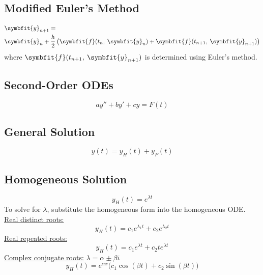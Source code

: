 \documentclass{article}
\begin{document}
\begin{multicols}{3}
    \subsection*{Modified Euler's Method}
    \begin{align*}
         & \symbfit{y}_{n+1} =                                                                                                       \\
         & \symbfit{y}_{n} + \frac{h}{2}\left( \symbfit{f}(t_n,\: \symbfit{y}_n) + \symbfit{f}(t_{n+1},\: \symbfit{y}_{n+1}) \right)
    \end{align*}
    where \(\symbfit{f}(t_{n+1},\: \symbfit{y}_{n+1})\) is determined using Euler's method.
    \subsection*{Second-Order ODEs}
    \begin{equation*}
        ay'' + by' + cy = F(t)
    \end{equation*}
    \subsection*{General Solution}
    \begin{equation*}
        y(t) = y_H(t) + y_P(t)
    \end{equation*}
    \subsection*{Homogeneous Solution}
    \begin{equation*}
        y_H(t) = e^{\lambda t}
    \end{equation*}
    To solve for \(\lambda\), substitute the homogeneous form into the homogeneous ODE\@. \\
    \underline{Real distinct roots:}
    \begin{equation*}
        y_H(t) = c_1e^{\lambda_1 t} + c_2e^{\lambda_2 t}
    \end{equation*}
    \underline{Real repeated roots:}
    \begin{equation*}
        y_H(t) = c_1e^{\lambda t} + c_2 te^{\lambda t}
    \end{equation*}
    \underline{Complex conjugate roots:} \(\lambda = \alpha \pm \beta i\)
    \begin{equation*}
        y_H(t) = e^{\alpha x}\bigl( c_1\cos{\left( \beta t \right)} + c_2 \sin{\left( \beta t \right)} \bigr)
    \end{equation*}

\end{multicols}
\end{document}
